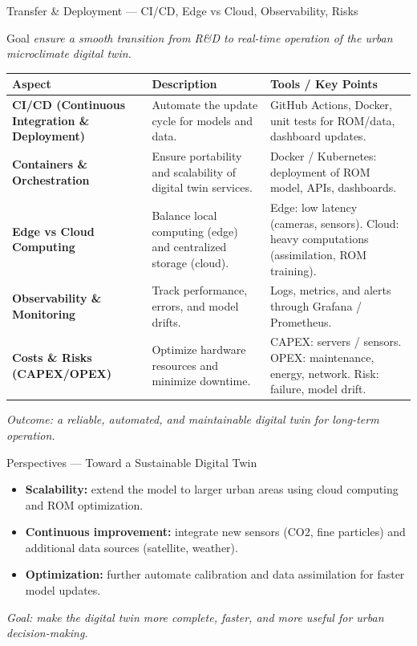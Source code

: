 \documentclass{beamer}
\begin{document}
\begin{frame}{Transfer \& Deployment — CI/CD, Edge vs Cloud, Observability, Risks}
\centering
\tiny
\begin{block}{Goal}
    \textit{ensure a smooth transition from R\&D to real-time operation of the urban microclimate digital twin.}
\end{block}
\vspace{0.4cm}
\begin{tabular}{|p{2.5cm}|p{3.5cm}|p{4.2cm}|}
\hline
\textbf{Aspect} & \textbf{Description} & \textbf{Tools / Key Points} \\
\hline
\textbf{CI/CD (Continuous Integration \& Deployment)} &
Automate the update cycle for models and data. &
GitHub Actions, Docker, unit tests for ROM/data, dashboard updates. \\
\hline
\textbf{Containers \& Orchestration} &
Ensure portability and scalability of digital twin services. &
Docker / Kubernetes: deployment of ROM model, APIs, dashboards. \\
\hline
\textbf{Edge vs Cloud Computing} &
Balance local computing (edge) and centralized storage (cloud). &
Edge: low latency (cameras, sensors).  
Cloud: heavy computations (assimilation, ROM training). \\
\hline
\textbf{Observability \& Monitoring} &
Track performance, errors, and model drifts. &
Logs, metrics, and alerts through Grafana / Prometheus. \\
\hline
\textbf{Costs \& Risks (CAPEX/OPEX)} &
Optimize hardware resources and minimize downtime. &
CAPEX: servers / sensors.  
OPEX: maintenance, energy, network.  
Risk: failure, model drift. \\
\hline
\end{tabular}

\vspace{0.3cm}
\textit{Outcome: a reliable, automated, and maintainable digital twin for long-term operation.}
\end{frame}


\begin{frame}{Perspectives — Toward a Sustainable Digital Twin}
\small
\begin{itemize}
    \item \textbf{Scalability:} extend the model to larger urban areas using cloud computing and ROM optimization.  
    \item \textbf{Continuous improvement:} integrate new sensors (CO2, fine particles) and additional data sources (satellite, weather).  
    \item \textbf{Optimization:} further automate calibration and data assimilation for faster model updates.  
\end{itemize}
\vspace{3mm}
\textit{Goal: make the digital twin more complete, faster, and more useful for urban decision-making.}
\end{frame}
\end{document}
